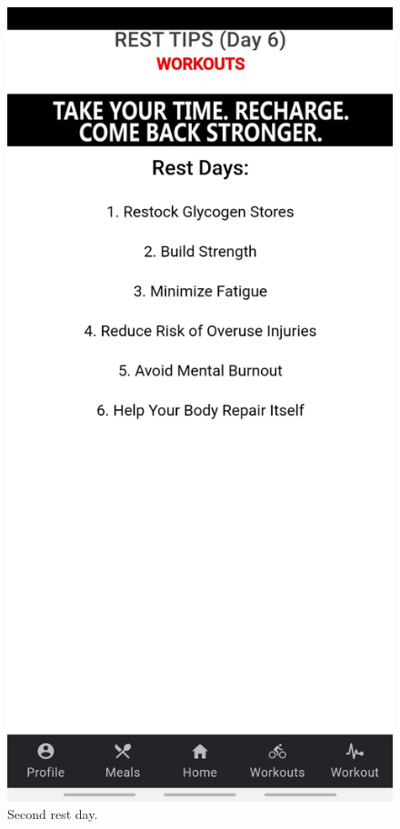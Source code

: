 \documentclass[a4paper,12pt]{report}
\begin{document}
\begin{figure}[ht]
\begin{minipage}[b]{0.5\linewidth}
    \includegraphics[width=.7\linewidth]{images/aplicationImages/restDay2.jpeg} 
    \caption{Second rest day.} 
    \vspace{4ex}
  \end{minipage}
\end{figure}
\end{document}
